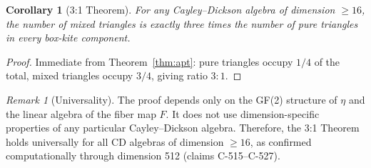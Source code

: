 \documentclass[12pt]{article}
\theoremstyle{definition}
\theoremstyle{plain}
\newtheorem{corollary}[theorem]{Corollary}
\theoremstyle{remark}
\newtheorem{remark}{Remark}[section]
\begin{document}
\begin{corollary}[3:1 Theorem]
For any Cayley--Dickson algebra of dimension $\geq 16$, the number of mixed
triangles is exactly three times the number of pure triangles in every
box-kite component.
\end{corollary}

\begin{proof}
Immediate from Theorem~\ref{thm:apt}: pure triangles occupy $1/4$ of the
total, mixed triangles occupy $3/4$, giving ratio $3:1$.
\end{proof}

\begin{remark}[Universality]
The proof depends only on the GF(2) structure of $\eta$ and the linear
algebra of the fiber map $F$.  It does not use dimension-specific
properties of any particular Cayley--Dickson algebra.  Therefore, the
3:1 Theorem holds universally for all CD algebras of dimension $\geq 16$,
as confirmed computationally through dimension 512 (claims C-515--C-527).
\end{remark}
\end{document}
